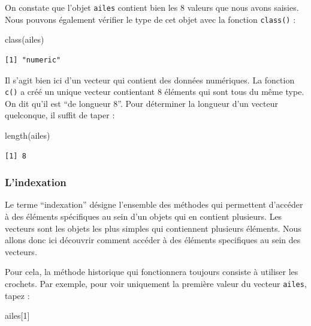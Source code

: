\documentclass[
  a4paper,
  DIV=11,
  numbers=noendperiod,
  oneside]{scrreprt}
\newenvironment{Shaded}{}{}
\newcommand{\DecValTok}[1]{\textcolor[rgb]{0.00,0.36,0.77}{#1}}
\newcommand{\FunctionTok}[1]{\textcolor[rgb]{0.44,0.26,0.76}{#1}}
\newcommand{\NormalTok}[1]{\textcolor[rgb]{0.14,0.16,0.18}{#1}}
\begin{document}
On constate que l'objet \texttt{ailes} contient bien les 8 valeurs que
nous avons saisies. Nous pouvons également vérifier le type de cet objet
avec la fonction \texttt{class()} :

\begin{Shaded}
\begin{Highlighting}[]
\FunctionTok{class}\NormalTok{(ailes)}
\end{Highlighting}
\end{Shaded}

\begin{verbatim}
[1] "numeric"
\end{verbatim}

Il s'agit bien ici d'un vecteur qui contient des données numériques. La
fonction \texttt{c()} a créé un unique vecteur contientant 8 éléments
qui sont tous du même type. On dit qu'il est ``de longueur 8''. Pour
déterminer la longueur d'un vecteur quelconque, il suffit de taper :

\begin{Shaded}
\begin{Highlighting}[]
\FunctionTok{length}\NormalTok{(ailes)}
\end{Highlighting}
\end{Shaded}

\begin{verbatim}
[1] 8
\end{verbatim}

\subsubsection{L'indexation}\label{lindexation}

Le terme ``indexation'' désigne l'ensemble des méthodes qui permettent
d'accéder à des éléments spécifiques au sein d'un objets qui en contient
plusieurs. Les vecteurs sont les objets les plus simples qui contiennent
plusieurs éléments. Nous allons donc ici découvrir comment accéder à des
éléments specifiques au sein des vecteurs.

Pour cela, la méthode historique qui fonctionnera toujours consiste à
utiliser les crochets. Par exemple, pour voir uniquement la première
valeur du vecteur \texttt{ailes}, tapez :

\begin{Shaded}
\begin{Highlighting}[]
\NormalTok{ailes[}\DecValTok{1}\NormalTok{]}
\end{Highlighting}
\end{Shaded}
\end{document}
